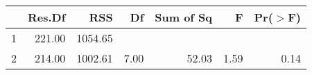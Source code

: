 \begin{table}[ht]
\centering
\begin{tabular}{lrrrrrr}
  \hline
 & Res.Df & RSS & Df & Sum of Sq & F & Pr($>$F) \\ 
  \hline
1 & 221.00 & 1054.65 &  &  &  &  \\ 
  2 & 214.00 & 1002.61 & 7.00 & 52.03 & 1.59 & 0.14 \\ 
   \hline
\end{tabular}
\end{table}
